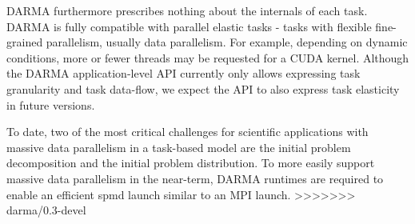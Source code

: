DARMA furthermore prescribes nothing about the internals of each task.
DARMA is fully compatible with parallel elastic tasks - tasks with flexible fine-grained parallelism, usually data parallelism.
For example, depending on dynamic conditions, more or fewer threads may be requested for a CUDA kernel.
Although the DARMA application-level API currently only allows expressing task granularity and task data-flow,
we expect the API to also express task elasticity in future versions.

To date, two of the most critical challenges for scientific applications with massive data parallelism in a task-based model
are the initial problem decomposition and the initial problem distribution.
To more easily support massive data parallelism in the near-term,
DARMA runtimes are required to enable an efficient \gls{spmd} launch similar to an MPI launch.
>>>>>>> darma/0.3-devel
